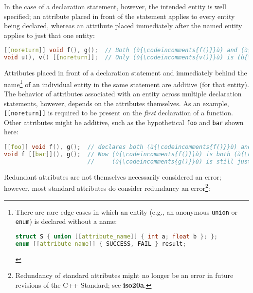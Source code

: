 In the case of a declaration statement, however, the intended entity is
well specified; an attribute placed in front of the statement applies to
every entity being declared, whereas an attribute placed immediately
after the named entity applies to just that one entity:

\begin{lstlisting}[language=C++]
[[noreturn]] void f(), g();  // Both (ù{\codeincomments{f()}}ù) and (ù{\codeincomments{g()}}ù) are (ù{\codeincomments{noreturn}}ù).
void u(), v() [[noreturn]];  // Only (ù{\codeincomments{v()}}ù) is (ù{\codeincomments{noreturn}}ù).
\end{lstlisting}
    
\noindent Attributes placed in front of a declaration statement and immediately
behind the name{\cprotect\footnote{There are rare edge cases in which an
entity (e.g., an anonymous \texttt{union} or \texttt{enum}) is
declared without a name:

\begin{lstlisting}[language=C++, basicstyle={\ttfamily\footnotesize}]
struct S { union [[attribute_name]] { int a; float b }; };
enum [[attribute_name]] { SUCCESS, FAIL } result;
\end{lstlisting} \vspace*{-1ex}
      }} of an individual entity in the same statement are additive (for
that entity). The behavior of attributes associated with an entity
across multiple declaration statements, however, depends on the
attributes themselves. As an example, \texttt{[[noreturn]]} is required
to be present on the \emph{first} declaration of a function. Other
attributes might be additive, such as the hypothetical \texttt{foo} and
\texttt{bar} shown here:

\begin{lstlisting}[language=C++]
[[foo]] void f(), g();  // declares both (ù{\codeincomments{f()}}ù) and (ù{\codeincomments{g()}}ù) to be (ù{\codeincomments{foo}}ù)
void f [[bar]](), g();  // Now (ù{\codeincomments{f()}}ù) is both (ù{\codeincomments{foo}}ù) and (ù{\codeincomments{bar}}ù) while
                        //     (ù{\codeincomments{g()}}ù) is still just (ù{\codeincomments{foo}}ù).
\end{lstlisting}
    
\noindent Redundant attributes are not themselves necessarily considered an error;
however, most standard attributes do consider redundancy an
error{\cprotect\footnote{Redundancy of standard
attributes might no longer be an error in future revisions of the
  C++ Standard; see \textbf{{iso20a}}.}}:

